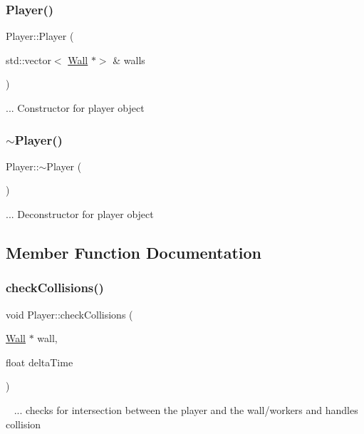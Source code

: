 \subsubsection{\texorpdfstring{Player()}{Player()}}
{\footnotesize\ttfamily Player\+::\+Player (\begin{DoxyParamCaption}\item[{std\+::vector$<$ \mbox{\hyperlink{class_wall}{Wall}} $\ast$$>$ \&}]{walls }\end{DoxyParamCaption})}

... Constructor for player object\mbox{\label{class_player_a749d2c00e1fe0f5c2746f7505a58c062}} 
\subsubsection{\texorpdfstring{$\sim$\+Player()}{~Player()}}
{\footnotesize\ttfamily Player\+::$\sim$\+Player (\begin{DoxyParamCaption}{ }\end{DoxyParamCaption})}

... Deconstructor for player object

\subsection{Member Function Documentation}
\mbox{\label{class_player_ae2d4369f7701288665103149e148a669}} 
\subsubsection{\texorpdfstring{check\+Collisions()}{checkCollisions()}}
{\footnotesize\ttfamily void Player\+::check\+Collisions (\begin{DoxyParamCaption}\item[{\mbox{\hyperlink{class_wall}{Wall}} $\ast$}]{wall,  }\item[{float}]{delta\+Time }\end{DoxyParamCaption})}

~\newline
... checks for intersection between the player and the wall/workers and handles collision\mbox{\label{class_player_a6a0b48c845f9c341283b5fc5a7898f9b}} 
